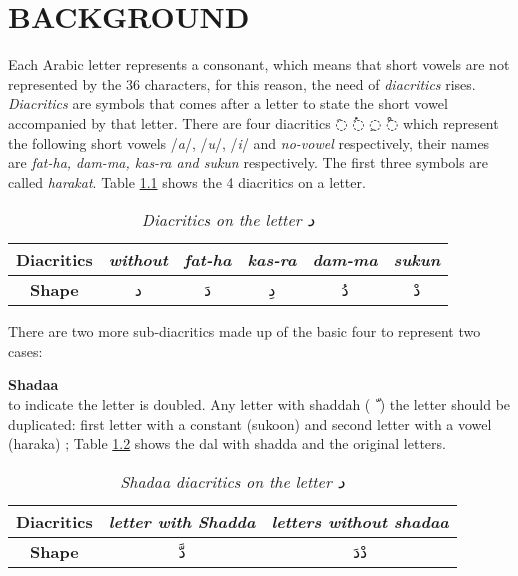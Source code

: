 \chapter{\uppercase{Background}}
Each Arabic letter represents a consonant, which means that short vowels are not
represented by the 36 characters, for this reason, the need of \textit{diacritics}
rises. \textit{Diacritics} are symbols that comes after a letter to state the
short vowel accompanied by that letter. There are four diacritics \textarabic{◌َ} \textarabic{◌ُ}
\textarabic{◌ِ} \textarabic{◌ْ} which represent the following short vowels
/\textit{a}/, /\textit{u}/, /\textit{i}/ and \textit{no-vowel} respectively,
their names are \textit{fat-ha, dam-ma, kas-ra and sukun} respectively.  The first
three symbols are called \textit{harakat}. Table \ref{tables:diacritics_dal}
shows the 4 diacritics on a letter.



\begin{table}[H]
	\centering
	\begin{tabular}{c c c c c c}
		\toprule
		\textbf{\small{Diacritics}}     & \small{\textit{without}} & \small{\textit{fat-ha}} &
		\small{\textit{kas-ra}} & \small{\textit{dam-ma}} & \small{\textit{sukun}}\\
		\midrule
		\textbf{\small{Shape}}   & \textarabic{د} & \textarabic{دَ} & \textarabic{دِ} &
		\textarabic{دُ} & \textarabic{دْ}\\
		\bottomrule
	\end{tabular}
	\caption{\textit{Diacritics on the letter  \textarabic{ د }}}\label{tables:diacritics_dal}
\end{table}



There are two more sub-diacritics made up of the basic four to represent two
cases:
\begin{definition}\label{def:shadaa_definition}
  \textbf{Shadaa}  \hfill \\
to indicate the letter is doubled. Any letter with
shaddah (\textarabic{ ّ } ) the letter should be duplicated: first letter with a
constant (sukoon) and second letter with a vowel (haraka) \cite{Alnagdawi2013}; Table  \ref{tables:shadda_dal}
shows the dal with shadda and the original letters.

\begin{table}[H]
	\centering
	\begin{tabular}{c c c}
		\toprule
		\textbf{\small{Diacritics}} & \small{\textit{letter with Shadda }} & \small{\textit{letters without shadaa  }} \\
		\midrule
		\textbf{\small{Shape}}  & \textarabic{دَّ} &  \textarabic{دْدَ}\\
		\bottomrule
	\end{tabular}
	\caption{\textit{Shadaa diacritics on the letter  \textarabic{ د }}}\label{tables:shadda_dal}
\end{table}

\end{definition}

